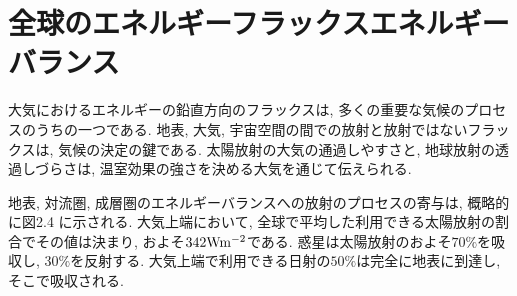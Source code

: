 \documentclass[a4j,12pt,openbib,oneside,dvipdfmx]{jbook}
\begin{document}
\section{全球のエネルギーフラックスエネルギーバランス}
大気におけるエネルギーの鉛直方向のフラックスは, 多くの重要な気候のプロセスのうちの一つである. 地表, 大気, 宇宙空間の間での放射と放射ではないフラックスは, 気候の決定の鍵である. 太陽放射の大気の通過しやすさと, 地球放射の透過しづらさは, 温室効果の強さを決める大気を通じて伝えられる.
\par
地表, 対流圏, 成層圏のエネルギーバランスへの放射のプロセスの寄与は, 概略的に図2.4 に示される. 大気上端において, 全球で平均した利用できる太陽放射の割合でその値は決まり, およそ$342 \rm{W}\rm{m}^{-2}$である. 
惑星は太陽放射のおよそ$70\%$を吸収し, $30\%$を反射する. 大気上端で利用できる日射の$50\%$は完全に地表に到達し, そこで吸収される. 
\end{document}
